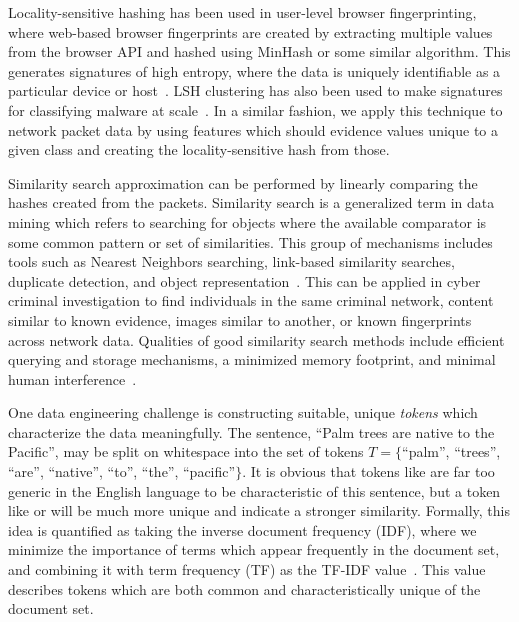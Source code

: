 Locality-sensitive hashing has been used in user-level browser fingerprinting, where web-based browser fingerprints are created by extracting multiple values from the browser API and hashed using MinHash or some similar algorithm. This generates signatures of high entropy, where the data is uniquely identifiable as a particular device or host~\cite{browser}. LSH clustering has also been used to make signatures for classifying malware at scale~\cite{bayer}. In a similar fashion, we apply this technique to network packet data by using features which should evidence values unique to a given class and creating the locality-sensitive hash from those.

Similarity search approximation can be performed by linearly comparing the hashes created from the packets. Similarity search is a generalized term in data mining which refers to searching for objects where the available comparator is some common pattern or set of similarities. This group of mechanisms includes tools such as Nearest Neighbors searching, link-based similarity searches, duplicate detection, and object representation~\cite{lshforest}. This can be applied in cyber criminal investigation to find individuals in the same criminal network, content similar to known evidence, images similar to another, or known fingerprints across network data. Qualities of good similarity search methods include efficient querying and storage mechanisms, a minimized memory footprint, and minimal human interference~\cite{simsearch}.

One data engineering challenge is constructing suitable, unique \textit{tokens} which characterize the data meaningfully. The sentence, ``Palm trees are native to the Pacific'', may be split on whitespace into the set of tokens $T = \{$``palm'', ``trees'', ``are'', ``native'', ``to'', ``the'', ``pacific''$\}$. It is obvious that tokens like  are far too generic in the English language to be characteristic of this sentence, but a token like  or  will be much more unique and indicate a stronger similarity. Formally, this idea is quantified as taking the inverse document frequency (IDF), where we minimize the importance of terms which appear frequently in the document set, and combining it with term frequency (TF) as the TF-IDF value~\cite{tf-idf}. This value describes tokens which are both common and characteristically unique of the document set.
